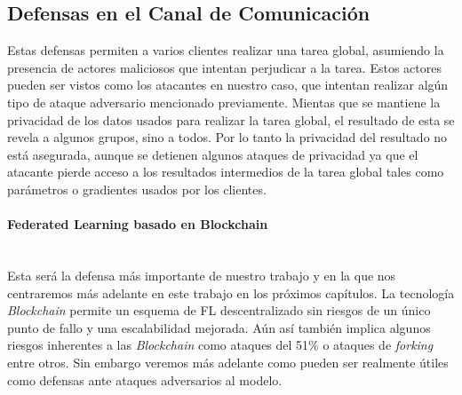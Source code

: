 \subsection{Defensas en el Canal de Comunicación}
Estas defensas permiten a varios clientes realizar una tarea global, asumiendo la presencia de actores maliciosos que intentan perjudicar a la tarea. Estos actores pueden ser vistos como los atacantes en nuestro caso, que intentan realizar algún tipo de ataque adversario mencionado previamente. Mientas que se mantiene la privacidad de los datos usados para realizar la tarea global, el resultado de esta se revela a algunos grupos, sino a todos. Por lo tanto la privacidad del resultado no está asegurada, aunque se detienen algunos ataques de privacidad ya que el atacante pierde acceso a los resultados intermedios de la tarea global tales como parámetros o gradientes usados por los clientes.

\paragraph{Federated Learning basado en Blockchain}\mbox{}\\
Esta será la defensa más importante de nuestro trabajo y en la que nos centraremos más adelante en este trabajo en los próximos capítulos. La tecnología \textit{Blockchain} permite un esquema de \ac{FL} descentralizado sin riesgos de un único punto de fallo y una escalabilidad mejorada. Aún así también implica algunos riesgos inherentes a las \textit{Blockchain} como ataques del 51\% o ataques de \textit{forking} entre otros. Sin embargo veremos más adelante como pueden ser realmente útiles como defensas ante ataques adversarios al modelo.